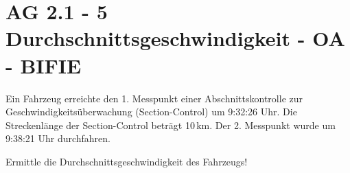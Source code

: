 \section{AG 2.1 - 5 Durchschnittsgeschwindigkeit - OA - BIFIE}

\begin{beispiel}[AG 2.1]{1} %
Ein Fahrzeug erreichte den 1. Messpunkt einer Abschnittskontrolle zur Geschwindigkeitsüberwachung (Section-Control) um 9:32:26 Uhr. Die Streckenlänge der Section-Control beträgt
10\,km. Der 2. Messpunkt wurde um 9:38:21 Uhr durchfahren.

\leer

Ermittle die Durchschnittsgeschwindigkeit des Fahrzeugs!

\end{beispiel}